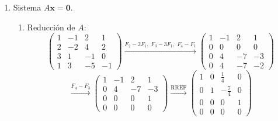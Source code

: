 \documentclass[12pt,letterpaper]{article}
\begin{document}
\begin{enumerate}
\begin{enumerate}
    \item Para la matriz diagonal $\text{diag}(a,b,c)$, su rango es igual al número de entradas diagonales distintas de cero:
    \begin{itemize}
        \item Si $a \neq 0$, $b \neq 0$, $c \neq 0$: $\text{rango} = 3$.
        \item Si exactamente uno es cero: $\text{rango} = 2$.
        \item Si exactamente dos son cero: $\text{rango} = 1$.
        \item Si $a = b = c = 0$: $\text{rango} = 0$.
    \end{itemize}

\end{enumerate}

\newpage
\item Sistema $A\mathbf{x} = \mathbf{0}$.

\begin{enumerate}

    \item Reducción de $A$:
    \[
    \begin{pmatrix} 1 & -1 & 2 & 1 \\ 2 & -2 & 4 & 2 \\ 3 & 1 & -1 & 0 \\ 1 & 3 & -5 & -1 \end{pmatrix}
    \xrightarrow{F_2-2F_1,\;F_3-3F_1,\;F_4-F_1}
    \begin{pmatrix} 1 & -1 & 2 & 1 \\ 0 & 0 & 0 & 0 \\ 0 & 4 & -7 & -3 \\ 0 & 4 & -7 & -2 \end{pmatrix}
    \]
    \[
    \xrightarrow{F_4 - F_3}
    \begin{pmatrix} 1 & -1 & 2 & 1 \\ 0 & 4 & -7 & -3 \\ 0 & 0 & 0 & 1 \\ 0 & 0 & 0 & 0 \end{pmatrix}
    \xrightarrow{\text{RREF}}
    \begin{pmatrix} 1 & 0 & \frac{1}{4} & 0 \\ 0 & 1 & -\frac{7}{4} & 0 \\ 0 & 0 & 0 & 1 \\ 0 & 0 & 0 & 0 \end{pmatrix}
    \]


\end{enumerate}
\end{enumerate}
\end{document}
